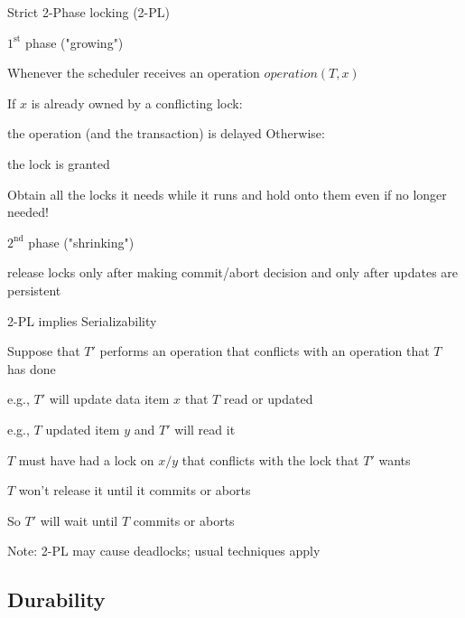 \begin{frame}{Strict 2-Phase locking (2-PL)}
\BI
\item $1^{\textrm{st}}$ phase ("growing")
  \BI
  \item Whenever the scheduler receives an operation $\mathit{operation}(T,x)$
  \item If $x$ is already owned by a conflicting lock:
    \BI
    \item the operation (and the transaction) is delayed   Otherwise:
    \item the lock is granted
	\EI
  \item Obtain all the locks it needs while it runs and hold onto them even if no longer needed!
  \EI
\item $2^{\textrm{nd}}$ phase ("shrinking")
  \BI
  \item release locks only after making commit/abort decision and only after updates are persistent
  \EI
\EI
\end{frame}

\begin{frame}{2-PL implies Serializability}
\BI
\item Suppose that $T'$ performs an operation that conflicts with an operation that $T$ has done
  \BI
  \item e.g., $T'$ will update data item $x$ that $T$ read or updated
  \item e.g., $T$ updated item $y$ and $T'$ will read it
  \EI
\item $T$ must have had a lock on $x/y$ that conflicts with the lock that $T'$ wants
  \BI
  \item $T$ won't release it until it commits or aborts
  \item So $T'$ will wait until $T$ commits or aborts
  \EI
\item Note: 2-PL may cause deadlocks; usual techniques apply
\EI
\end{frame}


\subsection{Durability}

